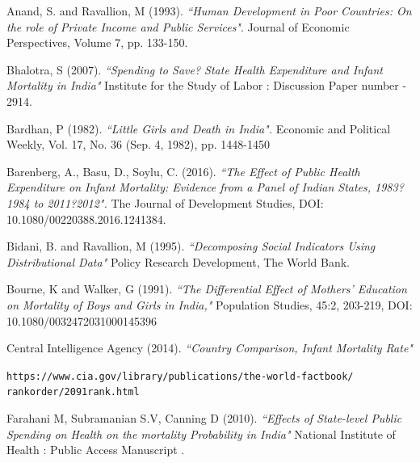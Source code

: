 \documentclass{article}
\begin{document}
\begin{thebibliography}{9}
Anand, S. and Ravallion, M (1993).
\textit{``Human Development in Poor Countries: On the role of Private Income and Public Services"}. 
Journal of Economic Perspectives, Volume 7, pp. 133-150.

Bhalotra, S (2007). 
\textit{``Spending to Save? State Health Expenditure and Infant Mortality in India"}
Institute for the Study of Labor : Discussion Paper number - 2914.

Bardhan, P (1982). 
\textit{``Little Girls and Death in India".}
Economic and Political Weekly, Vol. 17, No. 36 (Sep. 4, 1982), pp. 1448-1450

Barenberg, A., Basu, D., Soylu, C. (2016). 
\textit{``The Effect of Public Health Expenditure on Infant Mortality: Evidence from a Panel of Indian States, 1983?1984 to 2011?2012".}
The Journal of Development Studies, DOI: 10.1080/00220388.2016.1241384.

Bidani, B. and Ravallion, M (1995).
\textit{``Decomposing Social Indicators Using Distributional Data"}
Policy Research Development, The World Bank.

Bourne, K and Walker, G (1991).
\textit{``The Differential Effect of
Mothers' Education on Mortality of Boys and Girls in India,"}
Population Studies, 45:2, 203-219, DOI: 10.1080/0032472031000145396

Central Intelligence Agency (2014).
\textit{``Country Comparison, Infant Mortality Rate"}

\texttt{https://www.cia.gov/library/publications/the-world-factbook/
rankorder/2091rank.html}

Farahani M, Subramanian S.V, Canning D (2010).
\textit{``Effects of State-level Public Spending on Health on the mortality Probability in India"}
National Institute of Health : Public Access Manuscript .


\end{thebibliography}
\end{document}
